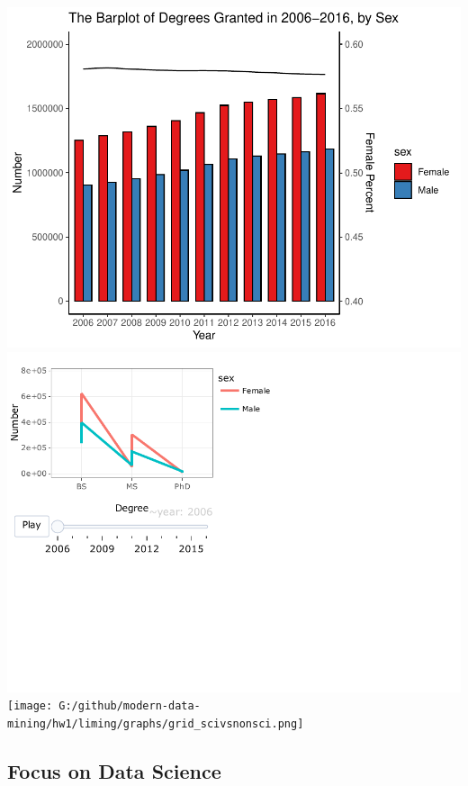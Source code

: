 \documentclass[
  12pt,
]{article}
\begin{document}
\includegraphics{hw1_sol_files/figure-latex/unnamed-chunk-11-1.pdf}
\includegraphics{hw1_sol_files/figure-latex/unnamed-chunk-11-2.pdf}
\texttt{[image: G:/github/modern-data-mining/hw1/liming/graphs/grid\_scivsnonsci.png]}

\hypertarget{focus-on-data-science}{%
\subsection{Focus on Data Science}\label{focus-on-data-science}}
\end{document}
